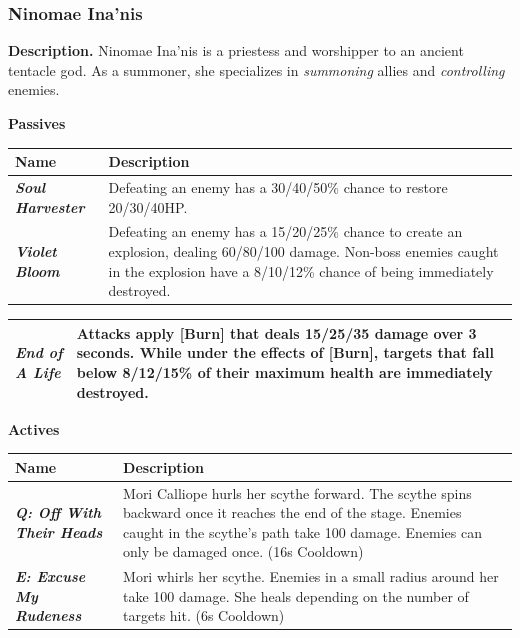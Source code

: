 \documentclass[10pt, a4paper]{article}
\begin{document}
\begin{multicols}{2}
	\subsubsection{Ninomae Ina'nis}
  	
  	\textbf{Description.} Ninomae Ina'nis is a priestess and worshipper to an ancient tentacle god. As a summoner, she specializes in \textit{summoning} allies and \textit{controlling} enemies.

	\textbf{Passives}
	
	\begin{center}
		\begin{tabular}{|p{2.7cm}|p{5.5cm}|}
			\hline
			\textbf{Name} & \textbf{Description} \\
			\hline
			\textit{\textbf{Soul Harvester}} & Defeating an enemy has a 30/40/50\% chance to restore 20/30/40HP. \\
			\textit{\textbf{Violet Bloom}} & Defeating an enemy has a 15/20/25\% chance to create an explosion, dealing 60/80/100 damage. Non-boss enemies caught in the explosion have a 8/10/12\% chance of being immediately destroyed. \\
		
		\end{tabular}
	\end{center}
	
	\begin{center}
		\begin{tabular}{|p{2.7cm}|p{5.5cm}|}
				\textit{\textbf{End of A Life}}  & Attacks apply [Burn] that deals 15/25/35 damage over 3 seconds. While under the effects of [Burn], targets that fall below 8/12/15\% of their maximum health are immediately destroyed. \\
			\hline
			
		\end{tabular}
	\end{center}
	
	\begin{center}
		\textbf{Actives}
	\end{center}
	
	\begin{center}
		\begin{tabular}{|p{2.7cm}|p{5.5cm}|}
			\hline
			\textbf{Name} & \textbf{Description} \\
			\hline
			\textit{\textbf{Q: Off With Their Heads}} & Mori Calliope hurls her scythe forward. The scythe spins backward once it reaches the end of the stage. Enemies caught in the scythe's path take 100 damage. Enemies can only be damaged once. (16s Cooldown)\\
			\textit{\textbf{E: Excuse My Rudeness}} & Mori whirls her scythe. Enemies in a small radius around her take 100 damage. She heals depending on the number of targets hit. (6s Cooldown) \\
			\hline
		\end{tabular}
	\end{center}
  	

\end{multicols}
\end{document}
